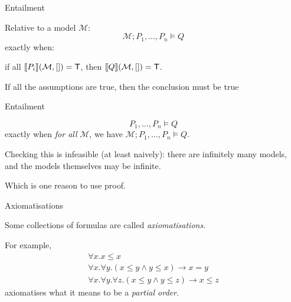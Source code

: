 \documentclass[xetex,aspectratio=169,14pt,hyperref={pdfpagelabels=true,pdflang={en-GB}}]{beamer}
\begin{document}
\begin{frame}
  {Entailment}

  Relative to a model $\mathcal{M}$:
  \begin{displaymath}
    \mathcal{M}; P_1, \dots, P_n \models Q
  \end{displaymath}
  exactly when:
  \begin{center}
    if all $\llbracket P_i \rrbracket(\mathcal{M},[]) = \mathsf{T}$, then $\llbracket Q \rrbracket(\mathcal{M},[]) = \mathsf{T}$.
  \end{center}

  \bigskip

  \textcolor{black!60}{If all the assumptions are true, then the conclusion must be true}
\end{frame}

\begin{frame}
  {Entailment}

  \begin{displaymath}
    P_1, \dots, P_n \models Q
  \end{displaymath}
  exactly when \emph{for all} $\mathcal{M}$, we have $\mathcal{M};P_1,\dots,P_n \models Q$.

  \bigskip

  Checking this is infeasible (at least naively): there are infinitely
  many models, and the models themselves may be infinite.

  \bigskip

  Which is one reason to use proof.
\end{frame}

\begin{frame}
  {Axiomatisations}

  Some collections of formulas are called \emph{axiomatisations}.

  \bigskip

  For example,
  \begin{displaymath}
    \begin{array}{l}
      \forall x. x \leq x \\
      \forall x. \forall y. (x \leq y \land y \leq x) \to x = y \\
      \forall x. \forall y. \forall z. (x \leq y \land y \leq z) \to x \leq z
    \end{array}
  \end{displaymath}
  axiomatises what it means to be a \emph{partial order}.
\end{frame}
\end{document}
